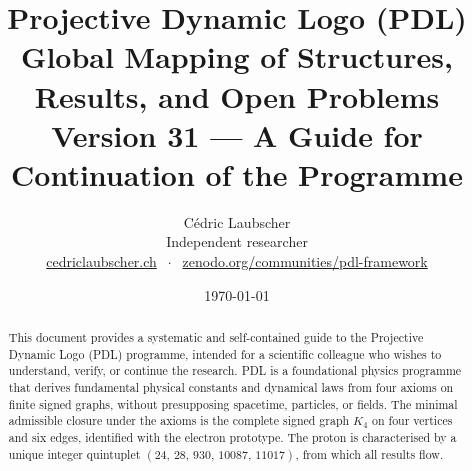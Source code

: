 \documentclass[11pt,a4paper]{article}
\title{Projective Dynamic Logo (PDL)\\[4pt]
\large Global Mapping of Structures, Results, and Open Problems\\[2pt]
\normalsize Version 31 --- A Guide for Continuation of the Programme}
\author{C\'edric Laubscher\\[4pt]
\small Independent researcher\\
\small \href{https://cedriclaubscher.ch}{cedriclaubscher.ch}
$\;\cdot\;$
\small \href{https://zenodo.org/communities/pdl-framework/}{zenodo.org/communities/pdl-framework}}
\date{\today}
\theoremstyle{plain}
\theoremstyle{definition}
\theoremstyle{remark}
\newcommand{\Kfour}{K_4}
\newcommand{\quintuplet}{(24,\,28,\,930,\,10087,\,11017)}
\begin{document}
\maketitle
\setcounter{tocdepth}{2}

\begin{abstract}
This document provides a systematic and self-contained guide to the Projective Dynamic Logo (PDL) programme, intended for a scientific colleague who wishes to understand, verify, or continue the research. PDL is a foundational physics programme that derives fundamental physical constants and dynamical laws from four axioms on finite signed graphs, without presupposing spacetime, particles, or fields. The minimal admissible closure under the axioms is the complete signed graph $\Kfour$ on four vertices and six edges, identified with the electron prototype. The proton is characterised by a unique integer quintuplet $\quintuplet$, from which all results flow.


\end{abstract}
\end{document}
